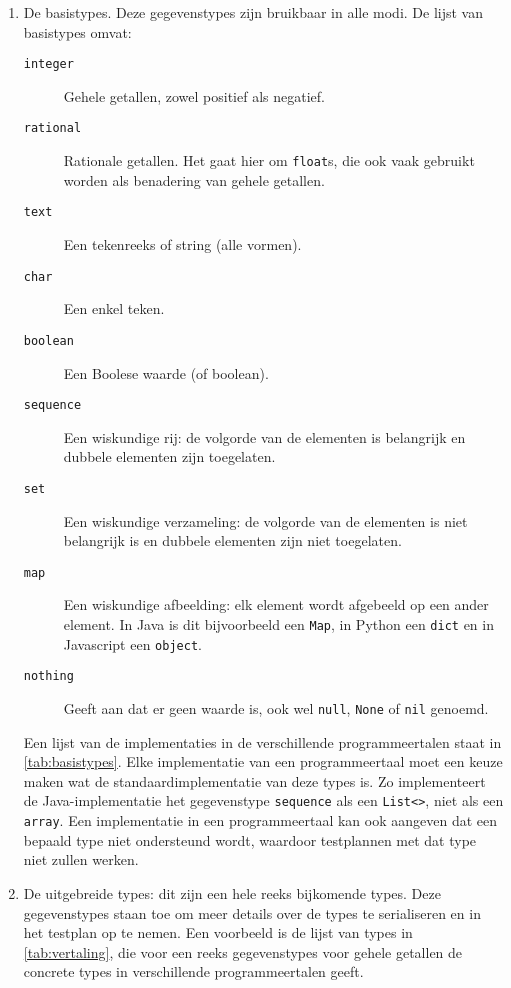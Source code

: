 \begin{enumerate}
    \item De basistypes.
    Deze gegevenstypes zijn bruikbaar in alle modi.
    De lijst van basistypes omvat:
    \begin{description}
        \item[\texttt{integer}] Gehele getallen, zowel positief als negatief.
        \item[\texttt{rational}] Rationale getallen.
        Het gaat hier om \texttt{float}s, die ook vaak gebruikt worden als benadering van gehele getallen.
        \item[\texttt{text}] Een tekenreeks of string (alle vormen).
        \item[\texttt{char}] Een enkel teken.
        \item[\texttt{boolean}] Een Boolese waarde (of boolean).
        \item[\texttt{sequence}] Een wiskundige rij: de volgorde van de elementen is belangrijk en dubbele elementen zijn toegelaten.
        \item[\texttt{set}] Een wiskundige verzameling: de volgorde van de elementen is niet belangrijk is en dubbele elementen zijn niet toegelaten.
        \item[\texttt{map}] Een wiskundige afbeelding: elk element wordt afgebeeld op een ander element.
        In Java is dit bijvoorbeeld een \texttt{Map}, in Python een \texttt{dict} en in Javascript een \texttt{object}.
        \item[\texttt{nothing}] Geeft aan dat er geen waarde is, ook wel \texttt{null}, \texttt{None} of \texttt{nil} genoemd.
    \end{description}
    Een lijst van de implementaties in de verschillende programmeertalen staat in \cref{tab:basistypes}.
    Elke implementatie van een programmeertaal moet een keuze maken wat de standaardimplementatie van deze types is.
    Zo implementeert de Java-implementatie het gegevenstype \texttt{sequence} als een \texttt{List<>}, niet als een \texttt{array}.
    Een implementatie in een programmeertaal kan ook aangeven dat een bepaald type niet ondersteund wordt, waardoor testplannen met dat type niet zullen werken.
    \item De uitgebreide types: dit zijn een hele reeks bijkomende types.
    Deze gegevenstypes staan toe om meer details over de types te serialiseren en in het testplan op te nemen.
    Een voorbeeld is de lijst van types in \cref{tab:vertaling}, die voor een reeks gegevenstypes voor gehele getallen de concrete types in verschillende programmeertalen geeft.

\end{enumerate}
